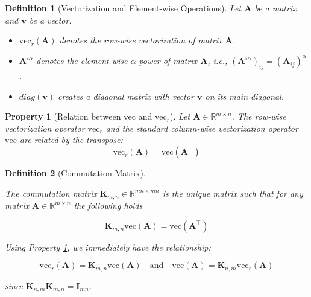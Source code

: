 \documentclass{article}
\newtheorem{definition}{Definition}
\newtheorem{property}{Property}
\begin{document}
\begin{definition}[Vectorization and Element-wise Operations] \label{def:vec_elem_ops}
Let $\mathbf{A}$ be a matrix and $\mathbf{v}$ be a vector.
\begin{itemize}
    \item $\mathrm{vec}_r(\mathbf{A})$ denotes the row-wise vectorization of matrix $\mathbf{A}$.
    \item $\mathbf{A}^{\circ \alpha}$ denotes the element-wise $\alpha$-power of matrix $\mathbf{A}$, i.e., $(\mathbf{A}^{\circ \alpha})_{ij} = (\mathbf{A}_{ij})^\alpha$.
    \item $\textit{diag}(\mathbf{v})$ creates a diagonal matrix with vector $\mathbf{v}$ on its main diagonal.
\end{itemize}
\end{definition}

\begin{property}[Relation between $\mathrm{vec}$ and $\mathrm{vec}_r$] \label{prop:vec_relation}
    Let $\mathbf{A} \in \mathbb{R}^{m \times n}$. The row-wise vectorization operator $\mathrm{vec}_r$ and the standard column-wise vectorization operator $\mathrm{vec}$ are related by the transpose:
\begin{equation*}
\mathrm{vec}_r(\mathbf{A}) = \mathrm{vec}(\mathbf{A}^\top)
\end{equation*}
\end{property}

\begin{definition}[Commutation Matrix] \label{def:commutation_matrix}

The commutation matrix $\mathbf{K}_{m,n} \in \mathbb{R}^{mn \times mn}$ is the unique matrix such that for any matrix $\mathbf{A} \in \mathbb{R}^{m \times n}$ the following holds

\begin{equation*}
\mathbf{K}_{m,n} \mathrm{vec}(\mathbf{A}) = \mathrm{vec}(\mathbf{A}^\top)
\end{equation*}

Using Property \ref{prop:vec_relation}, we immediately have the relationship:

\begin{equation*}
\mathrm{vec}_r(\mathbf{A}) = \mathbf{K}_{m,n} \mathrm{vec}(\mathbf{A}) \quad \text{and} \quad \mathrm{vec}(\mathbf{A}) = \mathbf{K}_{n,m} \mathrm{vec}_r(\mathbf{A})
\end{equation*}

since $\mathbf{K}_{n,m}\mathbf{K}_{m,n} = \mathbf{I}_{mn}$.
\end{definition}
\end{document}

